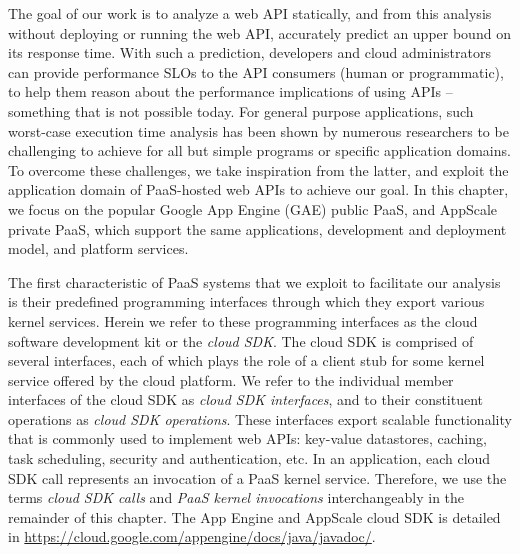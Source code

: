 The goal of our work is to analyze a web API statically, and from this analysis 
without deploying or running the web API, 
accurately predict an upper bound on its response time. With such a prediction,
developers and cloud administrators can provide performance SLOs to the API consumers (human or 
programmatic), to help them reason about 
the performance implications of using APIs -- something that is not possible today.
For general purpose applications, such worst-case execution time analysis has been shown
by numerous researchers to be challenging to achieve for all but 
simple programs or specific application domains.
To overcome these challenges, we take inspiration from the latter, and exploit 
the application domain of PaaS-hosted web APIs to achieve our goal.  
In this chapter, we focus on the popular Google App Engine (GAE) public PaaS, 
and AppScale private PaaS, which support the same applications, 
development and deployment model, and platform services.

The first characteristic of PaaS systems
that we exploit to facilitate our analysis 
is their predefined programming interfaces 
through which they export various kernel services. 
Herein we refer to these programming interfaces as the cloud software development 
kit or the \textit{cloud SDK}. The cloud SDK is comprised of several interfaces, each of which
plays the role of a client stub for some kernel service offered by the cloud platform.
We refer to the individual member interfaces of the cloud SDK
as \textit{cloud SDK interfaces}, and to their constituent operations 
as \textit{cloud SDK operations}.  These interfaces export scalable
functionality that is commonly used to implement web APIs:  
key-value datastores, 
caching, task scheduling, security and authentication, etc.
In an application, each cloud SDK call represents an invocation of a PaaS kernel
service. Therefore, we use the terms \textit{cloud SDK calls} and \textit{PaaS kernel invocations}
interchangeably in the remainder of this chapter. 
The App Engine and AppScale cloud SDK is detailed 
in \url{https://cloud.google.com/appengine/docs/java/javadoc/}.


